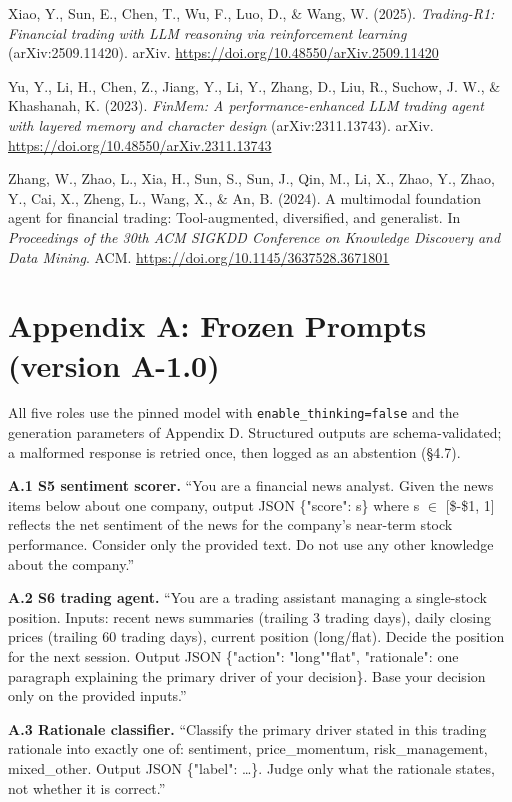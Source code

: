 \documentclass[
  12pt,
]{article}
\begin{document}
Xiao, Y., Sun, E., Chen, T., Wu, F., Luo, D., \& Wang, W. (2025).
\emph{Trading-R1: Financial trading with LLM reasoning via reinforcement
learning} (arXiv:2509.11420). arXiv.
\url{https://doi.org/10.48550/arXiv.2509.11420}

Yu, Y., Li, H., Chen, Z., Jiang, Y., Li, Y., Zhang, D., Liu, R., Suchow,
J. W., \& Khashanah, K. (2023). \emph{FinMem: A performance-enhanced LLM
trading agent with layered memory and character design}
(arXiv:2311.13743). arXiv.
\url{https://doi.org/10.48550/arXiv.2311.13743}

Zhang, W., Zhao, L., Xia, H., Sun, S., Sun, J., Qin, M., Li, X., Zhao,
Y., Zhao, Y., Cai, X., Zheng, L., Wang, X., \& An, B. (2024). A
multimodal foundation agent for financial trading: Tool-augmented,
diversified, and generalist. In \emph{Proceedings of the 30th ACM SIGKDD
Conference on Knowledge Discovery and Data Mining}. ACM.
\url{https://doi.org/10.1145/3637528.3671801}

\endgroup

\hypertarget{appendix-a-frozen-prompts-version-a-1.0}{%
\section{Appendix A: Frozen Prompts (version
A-1.0)}\label{appendix-a-frozen-prompts-version-a-1.0}}

All five roles use the pinned model with \texttt{enable\_thinking=false}
and the generation parameters of Appendix D. Structured outputs are
schema-validated; a malformed response is retried once, then logged as
an abstention (§4.7).

\textbf{A.1 S5 sentiment scorer.} ``You are a financial news analyst.
Given the news items below about one company, output JSON \{"score": s\}
where s \(\in\) {[}\$-\$1, 1{]} reflects the net sentiment of the news
for the company's near-term stock performance. Consider only the
provided text. Do not use any other knowledge about the company.''

\textbf{A.2 S6 trading agent.} ``You are a trading assistant managing a
single-stock position. Inputs: recent news summaries (trailing 3 trading
days), daily closing prices (trailing 60 trading days), current position
(long/flat). Decide the position for the next session. Output JSON
\{"action": "long"\textbar"flat", "rationale": one paragraph explaining
the primary driver of your decision\}. Base your decision only on the
provided inputs.''

\textbf{A.3 Rationale classifier.} ``Classify the primary driver stated
in this trading rationale into exactly one of: sentiment,
price\_momentum, risk\_management, mixed\_other. Output JSON \{"label":
\ldots\}. Judge only what the rationale states, not whether it is
correct.''
\end{document}
